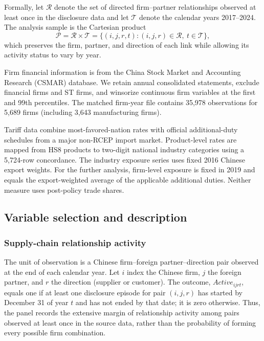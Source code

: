 \documentclass[preprint,12pt,authoryear]{elsarticle}
\begin{document}
Formally, let $\mathcal{R}$ denote the set of directed firm--partner relationships
observed at least once in the disclosure data and let $\mathcal{T}$ denote the
calendar years 2017--2024. The analysis sample is the Cartesian product
\begin{equation}
\label{eq:network}
\mathcal{P}=\mathcal{R}\times\mathcal{T}
=\{(i,j,r,t):(i,j,r)\in\mathcal{R},\ t\in\mathcal{T}\},
\end{equation}
which preserves the firm, partner, and direction of each link while allowing its
activity status to vary by year.

Firm financial information is from the China Stock Market and Accounting Research (CSMAR) database. We retain annual consolidated statements, exclude financial firms and ST firms, and winsorize continuous firm variables at the first and 99th percentiles. The matched firm-year file contains 35,978 observations for 5,689 firms (including 3,643 manufacturing firms).

Tariff data combine most-favored-nation rates with official additional-duty schedules from a major non-RCEP import market. Product-level rates are mapped from HS8 products to two-digit national industry categories using a 5,724-row concordance. The industry exposure series uses fixed 2016 Chinese export weights. For the further analysis, firm-level exposure is fixed in 2019 and equals the export-weighted average of the applicable additional duties. Neither measure uses post-policy trade shares.

\subsection{Variable selection and description}

\subsubsection{Supply-chain relationship activity}

The unit of observation is a Chinese firm--foreign partner--direction pair observed at the end of each calendar year. Let $i$ index the Chinese firm, $j$ the foreign partner, and $r$ the direction (supplier or customer). The outcome, $Active_{ijrt}$, equals one if at least one disclosure episode for pair $(i,j,r)$ has started by December 31 of year $t$ and has not ended by that date; it is zero otherwise. Thus, the panel records the extensive margin of relationship activity among pairs observed at least once in the source data, rather than the probability of forming every possible firm combination.
\end{document}
